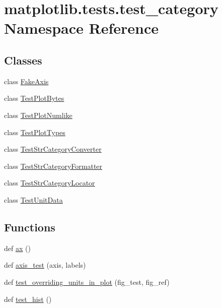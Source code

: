 \hypertarget{namespacematplotlib_1_1tests_1_1test__category}{}\section{matplotlib.\+tests.\+test\+\_\+category Namespace Reference}
\label{namespacematplotlib_1_1tests_1_1test__category}
\subsection*{Classes}
\begin{DoxyCompactItemize}
\item 
class \hyperlink{classmatplotlib_1_1tests_1_1test__category_1_1FakeAxis}{Fake\+Axis}
\item 
class \hyperlink{classmatplotlib_1_1tests_1_1test__category_1_1TestPlotBytes}{Test\+Plot\+Bytes}
\item 
class \hyperlink{classmatplotlib_1_1tests_1_1test__category_1_1TestPlotNumlike}{Test\+Plot\+Numlike}
\item 
class \hyperlink{classmatplotlib_1_1tests_1_1test__category_1_1TestPlotTypes}{Test\+Plot\+Types}
\item 
class \hyperlink{classmatplotlib_1_1tests_1_1test__category_1_1TestStrCategoryConverter}{Test\+Str\+Category\+Converter}
\item 
class \hyperlink{classmatplotlib_1_1tests_1_1test__category_1_1TestStrCategoryFormatter}{Test\+Str\+Category\+Formatter}
\item 
class \hyperlink{classmatplotlib_1_1tests_1_1test__category_1_1TestStrCategoryLocator}{Test\+Str\+Category\+Locator}
\item 
class \hyperlink{classmatplotlib_1_1tests_1_1test__category_1_1TestUnitData}{Test\+Unit\+Data}
\end{DoxyCompactItemize}
\subsection*{Functions}
\begin{DoxyCompactItemize}
\item 
def \hyperlink{namespacematplotlib_1_1tests_1_1test__category_ac4a78c2ee1d8720275b6d0ca5dee3c1c}{ax} ()
\item 
def \hyperlink{namespacematplotlib_1_1tests_1_1test__category_a0254453786522ce92c06264d0662bf9c}{axis\+\_\+test} (axis, labels)
\item 
def \hyperlink{namespacematplotlib_1_1tests_1_1test__category_abf9ea5dad3147adc60b994133c7388f6}{test\+\_\+overriding\+\_\+units\+\_\+in\+\_\+plot} (fig\+\_\+test, fig\+\_\+ref)
\item 
def \hyperlink{namespacematplotlib_1_1tests_1_1test__category_ad75667b8755f6ef5d87821552e36ab8a}{test\+\_\+hist} ()
\end{DoxyCompactItemize}
